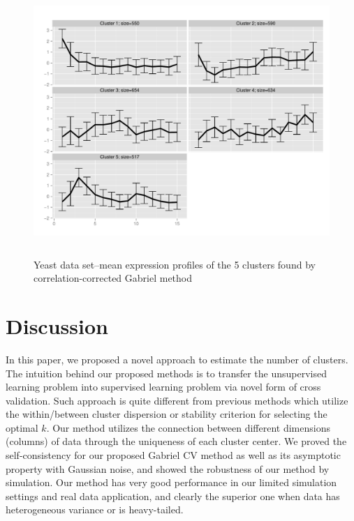 \documentclass[12pt]{article}
\begin{document}
	\begin{figure}[H]
		\centering
	\includegraphics[width=5.5in, height=4in]{wei/5_clusters.pdf}
	\caption{Yeast data set--mean expression profiles of the 5 clusters found by correlation-corrected Gabriel method}
	\label{fig:5_clusters}
	\end{figure}
	
\section{Discussion}
\label{sec:conc}
In this paper, we proposed a novel approach to estimate the number of
clusters. The intuition behind our proposed methods is to transfer the
unsupervised learning problem into supervised learning problem via novel form
of cross validation. Such approach is quite different from previous methods which 
utilize the within/between cluster dispersion or stability criterion for selecting the 
optimal $k$. Our method utilizes the connection between different dimensions (columns)
of data through the uniqueness of each cluster center. We proved the self-consistency 
for our proposed Gabriel CV method as well as its asymptotic property with Gaussian noise,
and showed the robustness of our method by simulation. Our method has very good performance
in our limited simulation settings and real data application, and clearly the superior
one when data has heterogeneous variance or is heavy-tailed.
\end{document}

